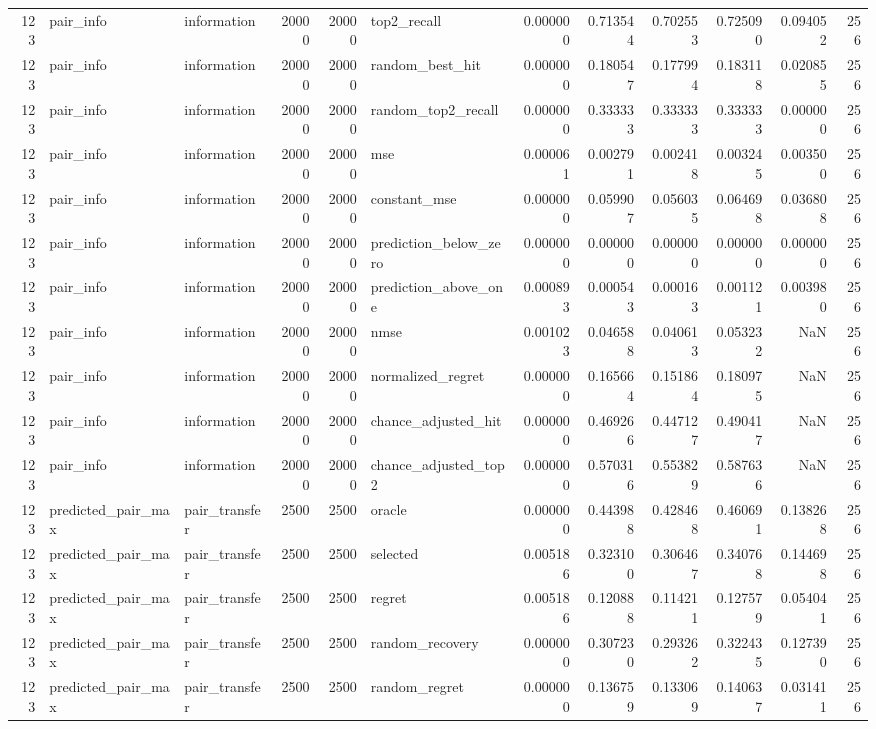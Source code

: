 \begin{tabular}{rllrrlrrrrrr}
123 & pair_info & information & 20000 & 20000 & top2_recall & 0.000000 & 0.713544 & 0.702553 & 0.725090 & 0.094052 & 256 \\
123 & pair_info & information & 20000 & 20000 & random_best_hit & 0.000000 & 0.180547 & 0.177994 & 0.183118 & 0.020855 & 256 \\
123 & pair_info & information & 20000 & 20000 & random_top2_recall & 0.000000 & 0.333333 & 0.333333 & 0.333333 & 0.000000 & 256 \\
123 & pair_info & information & 20000 & 20000 & mse & 0.000061 & 0.002791 & 0.002418 & 0.003245 & 0.003500 & 256 \\
123 & pair_info & information & 20000 & 20000 & constant_mse & 0.000000 & 0.059907 & 0.056035 & 0.064698 & 0.036808 & 256 \\
123 & pair_info & information & 20000 & 20000 & prediction_below_zero & 0.000000 & 0.000000 & 0.000000 & 0.000000 & 0.000000 & 256 \\
123 & pair_info & information & 20000 & 20000 & prediction_above_one & 0.000893 & 0.000543 & 0.000163 & 0.001121 & 0.003980 & 256 \\
123 & pair_info & information & 20000 & 20000 & nmse & 0.001023 & 0.046588 & 0.040613 & 0.053232 & NaN & 256 \\
123 & pair_info & information & 20000 & 20000 & normalized_regret & 0.000000 & 0.165664 & 0.151864 & 0.180975 & NaN & 256 \\
123 & pair_info & information & 20000 & 20000 & chance_adjusted_hit & 0.000000 & 0.469266 & 0.447127 & 0.490417 & NaN & 256 \\
123 & pair_info & information & 20000 & 20000 & chance_adjusted_top2 & 0.000000 & 0.570316 & 0.553829 & 0.587636 & NaN & 256 \\
123 & predicted_pair_max & pair_transfer & 2500 & 2500 & oracle & 0.000000 & 0.443988 & 0.428468 & 0.460691 & 0.138268 & 256 \\
123 & predicted_pair_max & pair_transfer & 2500 & 2500 & selected & 0.005186 & 0.323100 & 0.306467 & 0.340768 & 0.144698 & 256 \\
123 & predicted_pair_max & pair_transfer & 2500 & 2500 & regret & 0.005186 & 0.120888 & 0.114211 & 0.127579 & 0.054041 & 256 \\
123 & predicted_pair_max & pair_transfer & 2500 & 2500 & random_recovery & 0.000000 & 0.307230 & 0.293262 & 0.322435 & 0.127390 & 256 \\
123 & predicted_pair_max & pair_transfer & 2500 & 2500 & random_regret & 0.000000 & 0.136759 & 0.133069 & 0.140637 & 0.031411 & 256 \\

\end{tabular}
